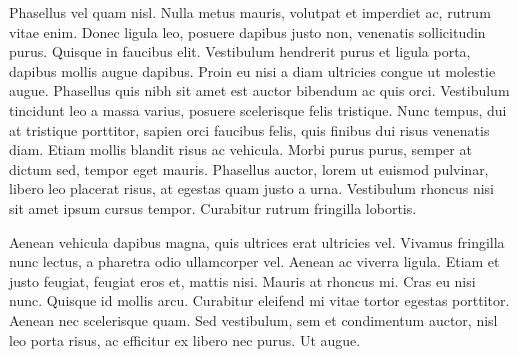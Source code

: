 \documentclass{amsbook}
\begin{document}
Phasellus vel quam nisl. Nulla metus mauris, volutpat et imperdiet ac, rutrum vitae enim. Donec ligula leo, posuere dapibus justo non, venenatis sollicitudin purus. Quisque in faucibus elit. Vestibulum hendrerit purus et ligula porta, dapibus mollis augue dapibus. Proin eu nisi a diam ultricies congue ut molestie augue. Phasellus quis nibh sit amet est auctor bibendum ac quis orci. Vestibulum tincidunt leo a massa varius, posuere scelerisque felis tristique. Nunc tempus, dui at tristique porttitor, sapien orci faucibus felis, quis finibus dui risus venenatis diam. Etiam mollis blandit risus ac vehicula. Morbi purus purus, semper at dictum sed, tempor eget mauris. Phasellus auctor, lorem ut euismod pulvinar, libero leo placerat risus, at egestas quam justo a urna. Vestibulum rhoncus nisi sit amet ipsum cursus tempor. Curabitur rutrum fringilla lobortis.

Aenean vehicula dapibus magna, quis ultrices erat ultricies vel. Vivamus fringilla nunc lectus, a pharetra odio ullamcorper vel. Aenean ac viverra ligula. Etiam et justo feugiat, feugiat eros et, mattis nisi. Mauris at rhoncus mi. Cras eu nisi nunc. Quisque id mollis arcu. Curabitur eleifend mi vitae tortor egestas porttitor. Aenean nec scelerisque quam. Sed vestibulum, sem et condimentum auctor, nisl leo porta risus, ac efficitur ex libero nec purus. Ut augue.

\clearpage
\end{document}
